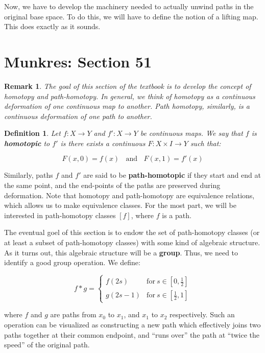 \documentclass[10pt, oneside]{amsart}
\newtheorem{defn}{Definition}
\newtheorem{rem}{Remark}
\begin{document}
    Now, we have to develop the machinery needed to actually unwind paths in the original base space. To do this, we will have to define the notion of a lifting map. This does exactly as it sounds.

    \section{Munkres: Section 51}

    \begin{rem}
    The goal of this section of the textbook is to develop the concept of homotopy and path-homotopy. In general, we think of homotopy as a continuous deformation of one
      continuous map to another. Path homotopy, similarly, is a continuous deformation of one path to another.
    \end{rem}

    \begin{defn}
      Let $f : X \rightarrow Y$ and $f' : X \rightarrow Y$ be continuous maps. We say that $f$ is \textbf{homotopic} to $f'$ is there exists a continuous $F : X \times I \rightarrow Y$ such that:

      $$F(x, 0) = f(x) \ \ \ \ \text{and} \ \ \ \ F(x, 1) = f'(x)$$
    \end{defn}

    Similarly, paths $f$ and $f'$ are said to be \textbf{path-homotopic} if they start and end at the same point, and the end-points of the paths are preserved during deformation.
    Note that homotopy and path-homotopy are equivalence relations, which allows us to make equivalence classes. For the most part, we will be interested in path-homotopy classes $[f]$, where
    $f$ is a path.
    \newline

    The eventual goel of this section is to endow the set of path-homotopy classes (or at least a subset of path-homotopy classes) with some kind of algebraic structure. As it turns out, this algebraic structure will
    be a \textbf{group}. Thus, we need to identify a good group operation. We define:

    $$f * g = \begin{cases}
      f(2s) & \text{for} \ s \in \left[ 0, \frac{1}{2} \right] \\
      g(2s - 1) & \text{for} \ s \in \left[\frac{1}{2}, 1\right]
    \end{cases}
    $$

    where $f$ and $g$ are paths from $x_0$ to $x_1$, and $x_1$ to $x_2$ respectively. Such an operation can be visualized as constructing a new path which effectively joins
    two paths together at their common endpoint, and ``runs over'' the path at ``twice the speed'' of the original path.
    \newline
\end{document}
